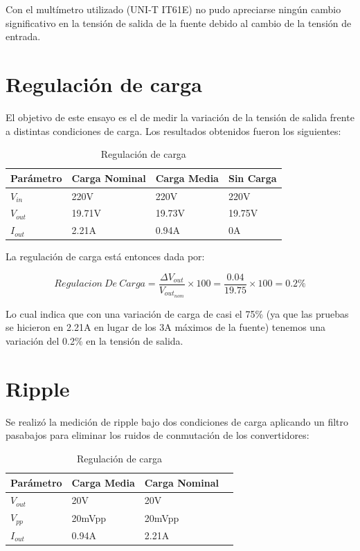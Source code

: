 \documentclass[12pt]{report}
\begin{document}
Con el multímetro utilizado (UNI-T IT61E) no pudo apreciarse ningún cambio significativo en la tensión de salida de la fuente debido al cambio de la tensión de entrada.

\section{Regulación de carga}

El objetivo de este ensayo es el de medir la variación de la tensión de salida frente a distintas condiciones de carga. Los resultados obtenidos fueron los siguientes:

\begin{table}[H]
	\centering
	\begin{tabular}{M{2cm}M{3cm}M{3cm}M{3cm}} \toprule
		Parámetro & Carga Nominal & Carga Media & Sin Carga \\
		\midrule
		$V_{in}$ & 220V & 220V & 220V \\
		$V_{out}$ & 19.71V & 19.73V & 19.75V \\
		$I_{out}$ & 2.21A & 0.94A & 0A \\
		\bottomrule
	\end{tabular}
	\caption{Regulación de carga}
\end{table}

La regulación de carga está entonces dada por:

\begin{equation}
	Regulacion \ De \ Carga = \frac{\Delta V_{out}}{V_{out_{nom}}} \times 100 = \frac{0.04}{19.75} \times 100 = 0.2\%
\end{equation}

Lo cual indica que con una variación de carga de casi el 75\% (ya que las pruebas se hicieron en 2.21A en lugar de los 3A máximos de la fuente) tenemos una variación del 0.2\% en la tensión de salida.

\section{Ripple}

Se realizó la medición de ripple bajo dos condiciones de carga aplicando un filtro pasabajos para eliminar los ruidos de conmutación de los convertidores:

\begin{table}[H]
	\centering
	\begin{tabular}{M{2cm}M{3cm}M{3cm}M{3cm}} \toprule
		Parámetro & Carga Media & Carga Nominal \\
		\midrule
		$V_{out}$ & 20V & 20V \\
		$V_{pp}$ & 20mVpp & 20mVpp \\
		$I_{out}$ & 0.94A & 2.21A \\
		\bottomrule
	\end{tabular}
	\caption{Regulación de carga}
\end{table}
\end{document}
